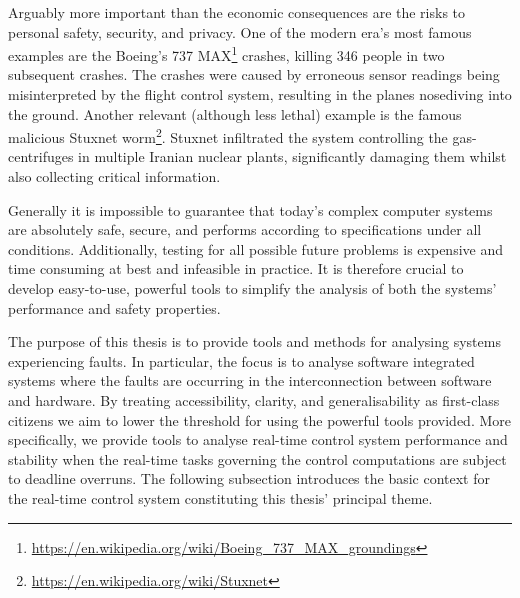 Arguably more important than the economic consequences are the risks to personal safety, security, and privacy.
One of the modern era's most famous examples are the Boeing's 737 MAX\footnote{\url{https://en.wikipedia.org/wiki/Boeing_737_MAX_groundings}} crashes, killing 346 people in two subsequent crashes.
The crashes were caused by erroneous sensor readings being misinterpreted by the flight control system, resulting in the planes nosediving into the ground.
Another relevant (although less lethal) example is the famous malicious Stuxnet worm\footnote{\url{https://en.wikipedia.org/wiki/Stuxnet}}.
Stuxnet infiltrated the system controlling the gas-centrifuges in multiple Iranian nuclear plants, significantly damaging them whilst also collecting critical information. 

Generally it is impossible to guarantee that today's complex computer systems are absolutely safe, secure, and performs according to specifications under all conditions.
Additionally, testing for all possible future problems is expensive and time consuming at best and infeasible in practice.
It is therefore crucial to develop easy-to-use, powerful tools to simplify the analysis of both the systems' performance and safety properties.

The purpose of this thesis is to provide tools and methods for analysing systems experiencing faults.
In particular, the focus is to analyse software integrated systems where the faults are occurring in the interconnection between software and hardware.
By treating accessibility, clarity, and generalisability as first-class citizens we aim to lower the threshold for using the powerful tools provided. 
More specifically, we provide tools to analyse real-time control system performance and stability when the real-time tasks governing the control computations are subject to deadline overruns.
The following subsection introduces the basic context for the real-time control system constituting this thesis' principal theme.


